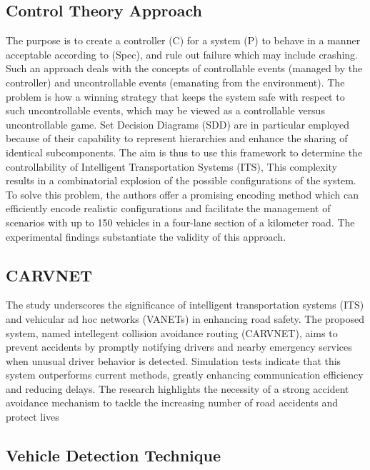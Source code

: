 \documentclass[12pt,twocolumn]{article}
\begin{document}
\subsection{Control Theory Approach}
The purpose is to create a controller (C) for a system (P) to behave in a manner acceptable according to (Spec), and rule out failure which may include crashing. Such an approach deals with the concepts of controllable events (managed by the controller) and uncontrollable events (emanating from the environment). The problem is how a winning strategy that keeps the system safe with respect to such uncontrollable events, which may be viewed as a controllable versus uncontrollable game.
Set Decision Diagrams (SDD) are in particular employed because of their capability to represent hierarchies and enhance the sharing of identical subcomponents. The aim is thus to use this framework to determine the controllability of Intelligent Transportation Systems (ITS), This complexity results in a combinatorial explosion of the possible configurations of the system. To solve this problem, the authors offer a promising encoding method which can efficiently encode realistic configurations and facilitate the management of scenarios with up to 150 vehicles in a four-lane section of a kilometer road. The experimental findings substantiate the validity of this approach.

\subsection{CARVNET}
The study underscores the significance of intelligent transportation systems (ITS) and vehicular ad hoc networks (VANETs) in enhancing road safety. The proposed system, named
intellegent collision avoidance routing (CARVNET), aims to prevent accidents by promptly notifying drivers and nearby emergency services when unusual driver behavior is detected. Simulation tests indicate that this system outperforms current methods, greatly enhancing communication efficiency and reducing delays. The research highlights the necessity of a strong accident avoidance mechanism to tackle the increasing number of road accidents and protect lives

\subsection{Vehicle Detection Technique}
\end{document}
